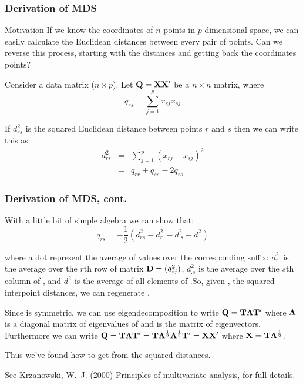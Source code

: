 \documentclass{beamer}
\begin{document}
\begin{frame}[shrink=5]
\frametitle{Derivation of MDS}

\begin{block}{Motivation}
    If we know the coordinates of $n$ points in $p$-dimensional space, we can easily calculate the Euclidean distances between every pair of points. \alert{Can we reverse this process, starting with the distances and getting back the coordinates points?}
\end{block}

Consider a data matrix  ($n \times p$).  Let  $\mathbf{Q} = \mathbf{X}\mathbf{X}'$ be a $n \times n$ matrix, where
\[
q_{rs} = \sum_{j=1}^p x_{rj}x_{sj}
\]

If $d_{rs}^2$ is the squared Euclidean distance between points $r$ and $s$ then we can write this as:
\begin{eqnarray*}
d_{rs}^2 &=& \sum_{j=1}^p (x_{rj}-x_{sj})^2 \\
         &=& q_{rr} + q_{ss} - 2q_{rs}
\end{eqnarray*}

\end{frame}

\begin{frame}[shrink=5]
\frametitle{Derivation of MDS, cont.}

With a little bit of simple algebra we can show that:
\[
q_{rs} = -\frac{1}{2}(d_{rs}^2- d_{r.}^2 - d_{.s}^2 - d_{..}^2)
\]

where a dot represent the average of values over the corresponding suffix: $d_{r.}^2$ is the average over the $r$th row of matrix $\mathbf{D}=(d_{ij}^2)$, $d_{.s}^2$ is the average over the $s$th column of , and $d_{..}^2$ is the average of all elements of .So, given , the squared interpoint distances, we can regenerate .

Since  is symmetric, we can use eigendecomposition to write $\mathbf{Q}=\mathbf{T}\mathbf{\Lambda}\mathbf{T}'$  where $\mathbf{\Lambda}$ is a diagonal matrix of eigenvalues of  and  is the matrix of eigenvectors. Furthermore we can write $\mathbf{Q}=\mathbf{T}\mathbf{\Lambda}\mathbf{T}'=\mathbf{T}\mathbf{\Lambda}^{\frac{1}{2}}\mathbf{\Lambda}^{\frac{1}{2}}\mathbf{T}'= \mathbf{X}\mathbf{X}'$ where $\mathbf{X}=\mathbf{T}\mathbf{\Lambda}^{\frac{1}{2}}$.

\alert{Thus we've found how to get  from the squared distances.}

{\footnotesize See Krzanowski, W.\ J. (2000) Principles of multivariate analysis, for full details.}
\end{frame}
\end{document}
